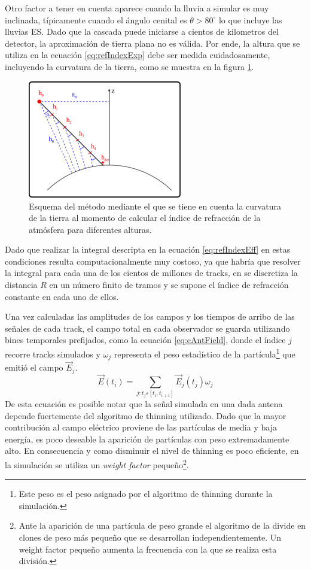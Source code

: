 		Otro factor a tener en cuenta aparece cuando la lluvia a simular es muy inclinada, t\'ipicamente cuando el \'angulo cenital es $\theta>80^\circ$ lo que incluye las lluvias ES.
		Dado que la cascada puede iniciarse a cientos de kilometros del detector, la aproximaci\'on de tierra plana no es v\'alida.
		Por ende, la altura que se utiliza en la ecuaci\'on \ref{eq:refIndexExp} debe ser medida cuidadosamente, incluyendo la curvatura de la tierra, como se muestra en la figura \ref{fig:refIndex}.
		\begin{figure}[ht!]
		\centering
			\includegraphics[width=0.6\textwidth]{fig/simulacionRadio/refIndex}
			\caption{\label{fig:refIndex} Esquema del m\'etodo mediante el que se tiene en cuenta la curvatura de la tierra al momento de calcular el \'indice de refracci\'on de la atm\'osfera para diferentes alturas.}
		\end{figure}
		Dado que realizar la integral descripta en la ecuaci\'on \ref{eq:refIndexEff} en estas condiciones resulta computacionalmente muy costoso, ya que habr\'ia que resolver la integral para cada una de los cientos de millones de tracks, en \zhs{} se discretiza la distancia $R$ en un n\'umero finito de tramos y se supone el \'indice de refracci\'on constante en cada uno de ellos.
		
		Una vez calculadas las amplitudes de los campos y los tiempos de arribo de las se\~nales de cada track, el campo total en cada observador se guarda utilizando bines temporales prefijados, como la ecuaci\'on \ref{eq:eAntField}, donde el \'indice $j$ recorre tracks simulados y $\omega_j$ representa el peso estad\'istico de la part\'icula\footnote{Este peso es el peso asignado por el algoritmo de thinning durante la simulaci\'on.} que emiti\'o el campo $\vec{E}_j$.
		\begin{equation}
		\vec{E}(t_i)=\sum_{j:t_j\varepsilon[t_i,t_{i+1}]}\vec{E}_j(t_j)\omega_j
		\label{eq:eAntField}
		\end{equation}
		De esta ecuaci\'on es posible notar que la se\~nal simulada en una dada antena depende fuertemente del algoritmo de thinning utilizado. 
		Dado que la mayor contribuci\'on al campo el\'ectrico proviene de las part\'iculas de media y baja energ\'ia, es poco deseable la aparici\'on de partículas con peso extremadamente alto.
		En consecuencia y como disminuir el nivel de thinning es poco eficiente, en la simulación se utiliza un \emph{weight factor} peque\~no\footnote{Ante la aparici\'on de una part\'icula de peso grande el algoritmo de \aires{} la divide en clones de peso m\'as peque\~no que se desarrollan independientemente. Un weight factor peque\~no aumenta la frecuencia con la que se realiza esta divisi\'on.}.
		
